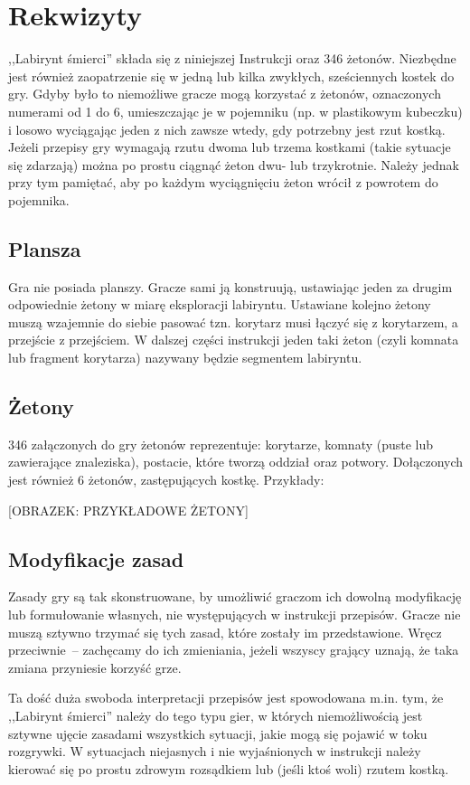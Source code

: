 \section{Rekwizyty}

,,Labirynt śmierci'' składa się z niniejszej Instrukcji oraz 346 żetonów.
Niezbędne jest również zaopatrzenie się w jedną lub kilka zwykłych, sześciennych kostek do gry.
Gdyby było to niemożliwe gracze mogą korzystać z żetonów, oznaczonych numerami od 1 do 6, umieszczając je w pojemniku (np. w plastikowym kubeczku) i losowo wyciągając jeden z nich zawsze wtedy, gdy potrzebny jest rzut kostką.
Jeżeli przepisy gry wymagają rzutu dwoma lub trzema kostkami (takie sytuacje się zdarzają) można po prostu ciągnąć żeton dwu- lub trzykrotnie.
Należy jednak przy tym pamiętać, aby po każdym wyciągnięciu żeton wrócił z powrotem do pojemnika.

\subsection{Plansza}

Gra nie posiada planszy.
Gracze sami ją konstruują, ustawiając jeden za drugim odpowiednie żetony w miarę eksploracji labiryntu.
Ustawiane kolejno żetony muszą wzajemnie do siebie pasować tzn. korytarz musi łączyć się z korytarzem, a przejście z przejściem.
W dalszej części instrukcji jeden taki żeton (czyli komnata lub fragment korytarza) nazywany będzie segmentem labiryntu.

\subsection{Żetony}

346 załączonych do gry żetonów reprezentuje: korytarze, komnaty (puste lub zawierające znaleziska), postacie, które tworzą oddział oraz potwory.
Dołączonych jest również 6 żetonów, zastępujących kostkę.
Przykłady:

[OBRAZEK: PRZYKŁADOWE ŻETONY]

\subsection{Modyfikacje zasad}

Zasady gry są tak skonstruowane, by umożliwić graczom ich dowolną modyfikację lub formułowanie własnych, nie występujących w instrukcji przepisów.
Gracze nie muszą sztywno trzymać się tych zasad, które zostały im przedstawione.
Wręcz przeciwnie~-- zachęcamy do ich zmieniania, jeżeli wszyscy grający uznają, że taka zmiana przyniesie korzyść grze.

Ta dość duża swoboda interpretacji przepisów jest spowodowana m.in. tym, że ,,Labirynt śmierci'' należy do tego typu gier, w których niemożliwością jest sztywne ujęcie zasadami wszystkich sytuacji, jakie mogą się pojawić w toku rozgrywki.
W sytuacjach niejasnych i nie wyjaśnionych w instrukcji należy kierować się po prostu zdrowym rozsądkiem lub (jeśli ktoś woli) rzutem kostką.
